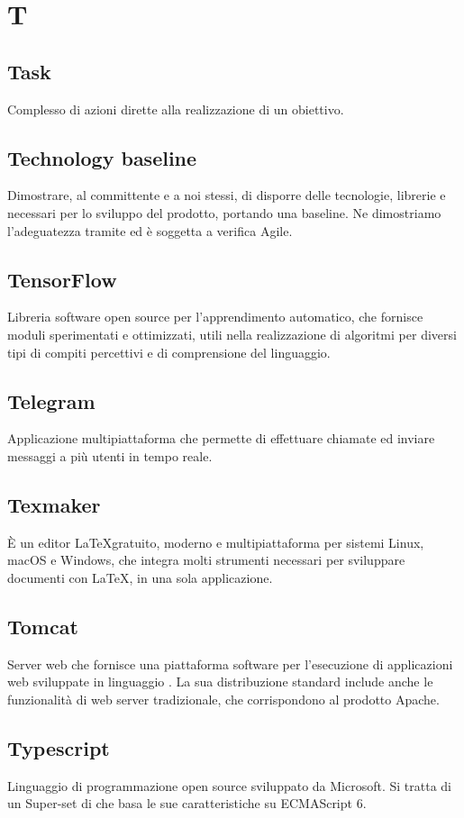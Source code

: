 \section*{T}
\markright{}

\subsection*{Task}
Complesso di azioni dirette alla realizzazione di un obiettivo.

\subsection*{Technology baseline}
Dimostrare, al committente e a noi stessi, di disporre delle tecnologie, librerie e  necessari per lo sviluppo del prodotto, portando una baseline. Ne dimostriamo l’adeguatezza tramite  ed è soggetta a verifica Agile.

\subsection*{TensorFlow}
Libreria software open source per l'apprendimento automatico, che fornisce moduli sperimentati e ottimizzati, utili nella realizzazione di algoritmi per diversi tipi di compiti percettivi e di comprensione del linguaggio.

\subsection*{Telegram}
Applicazione multipiattaforma che permette di effettuare chiamate ed inviare messaggi a più utenti in tempo reale.

\subsection*{Texmaker}
È un editor \LaTeX gratuito, moderno e multipiattaforma per sistemi Linux, macOS e Windows, che integra molti strumenti necessari per sviluppare documenti con \LaTeX, in una sola applicazione.

\subsection*{Tomcat}
Server web che fornisce una piattaforma software per l'esecuzione di applicazioni web sviluppate in linguaggio . La sua distribuzione standard include anche le funzionalità di web server tradizionale, che corrispondono al prodotto Apache. 

\subsection*{Typescript}
Linguaggio di programmazione open source sviluppato da Microsoft. Si tratta di un Super-set di  che basa le sue caratteristiche su ECMAScript 6.

